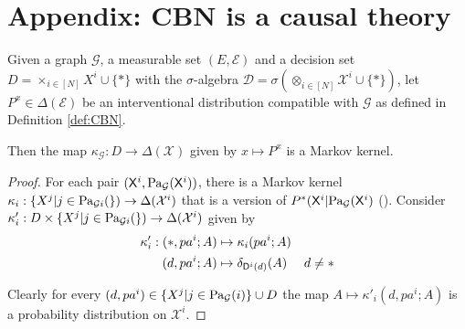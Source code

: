 \section{Appendix: CBN is a causal theory}\label{app:cbn_ct}

\begin{theorem}
Given a graph $\mathcal{G}$, a measurable set $(E,\mathcal{E})$ and a decision set $D=\times_{i\in [N]} X^i\cup\{*\}$ with the $\sigma$-algebra $\mathcal{D}=\sigma(\otimes_{i\in [N]} \mathcal{X}^i\cup\{*\})$, let $P^x\in \Delta(\mathcal{E})$ be an interventional distribution compatible with $\mathcal{G}$ as defined in Definition \ref{def:CBN}. 

Then the map $\kappa_{\mathcal{G}}:D\to \Delta(\mathcal{X})$ given by $x\mapsto P^x$ is a Markov kernel.
\end{theorem}

\begin{proof}
For each pair $(\mathsf{X}^i,\text{Pa}_{\mathcal{G}}(\mathsf{X}^i))$, there is a Markov kernel $\kappa_i:\{X^j|j\in \text{Pa}_{\mathcal{G}{i}}(\})\to \Delta(\mathcal{X}^i)$ that is a version of $P^*(\mathsf{X}^i|\text{Pa}_{\mathcal{G}}(\mathsf{X}^i)$ (\cite{cinlar_probability_2011}). Consider $\kappa'_i:D\times \{X^j|j\in \text{Pa}_{\mathcal{G}{i}}(\}) \to \Delta(\mathcal{X}^i)$ given by \begin{align}
    \kappa'_i: (*,pa^i;A)&\mapsto \kappa_i(pa^i;A)&\\
               (d,pa^i;A)&\mapsto \delta_{\mathsf{D}^i(d)}(A)&d\neq *
\end{align}

Clearly for every $(d,pa^i) \in \{X^j|j\in \text{Pa}_{\mathcal{G}}(i)\}\cup D$ the map $A\mapsto \kappa'_i(d,pa^i;A)$ is a probability distribution on $\mathcal{X}^i$.



\end{proof}